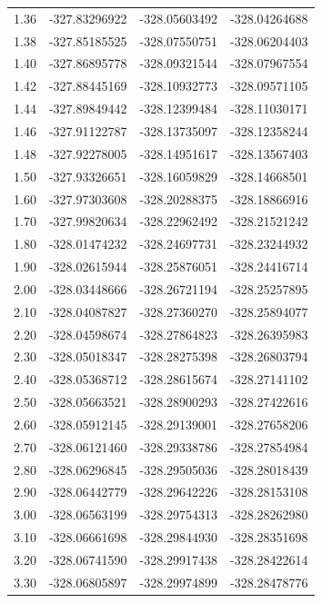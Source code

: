 {{\begin{longtable}{p{} p{} p{} p{}}
    1.36  & -327.83296922 & -328.05603492 & -328.04264688 \\
    1.38  & -327.85185525 & -328.07550751 & -328.06204403 \\
    1.40  & -327.86895778 & -328.09321544 & -328.07967554 \\
    1.42  & -327.88445169 & -328.10932773 & -328.09571105 \\
    1.44  & -327.89849442 & -328.12399484 & -328.11030171 \\
    1.46  & -327.91122787 & -328.13735097 & -328.12358244 \\
    1.48  & -327.92278005 & -328.14951617 & -328.13567403 \\
    1.50  & -327.93326651 & -328.16059829 & -328.14668501 \\
    1.60  & -327.97303608 & -328.20288375 & -328.18866916 \\
    1.70  & -327.99820634 & -328.22962492 & -328.21521242 \\
    1.80  & -328.01474232 & -328.24697731 & -328.23244932 \\
    1.90  & -328.02615944 & -328.25876051 & -328.24416714 \\
    2.00  & -328.03448666 & -328.26721194 & -328.25257895 \\
    2.10  & -328.04087827 & -328.27360270 & -328.25894077 \\
    2.20  & -328.04598674 & -328.27864823 & -328.26395983 \\
    2.30  & -328.05018347 & -328.28275398 & -328.26803794 \\
    2.40  & -328.05368712 & -328.28615674 & -328.27141102 \\
    2.50  & -328.05663521 & -328.28900293 & -328.27422616 \\
    2.60  & -328.05912145 & -328.29139001 & -328.27658206 \\
    2.70  & -328.06121460 & -328.29338786 & -328.27854984 \\
    2.80  & -328.06296845 & -328.29505036 & -328.28018439 \\
    2.90  & -328.06442779 & -328.29642226 & -328.28153108 \\
    3.00  & -328.06563199 & -328.29754313 & -328.28262980 \\
    3.10  & -328.06661698 & -328.29844930 & -328.28351698 \\
    3.20  & -328.06741590 & -328.29917438 & -328.28422614 \\
    3.30  & -328.06805897 & -328.29974899 & -328.28478776 \\

\end{longtable}}}
